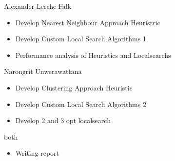 \documentclass[12pt]{article}
\begin{document}
Alexander Lerche Falk
\begin{itemize}
	\item Develop Nearest Neighbour Approach Heuristric \item Develop Custom Local Search Algorithms 1
	\item Performance analysis of Heuristics and Localsearchs
\end{itemize}
Narongrit Unwerawattana
\begin{itemize}
	\item Develop Clustering Approach Heuristic
	\item Develop Custom Local Search Algorithms 2
	\item Develop 2 and 3 opt localsearch
\end{itemize}
both
\begin{itemize}
	\item Writing report
\end{itemize}


\newpage


\end{document}
